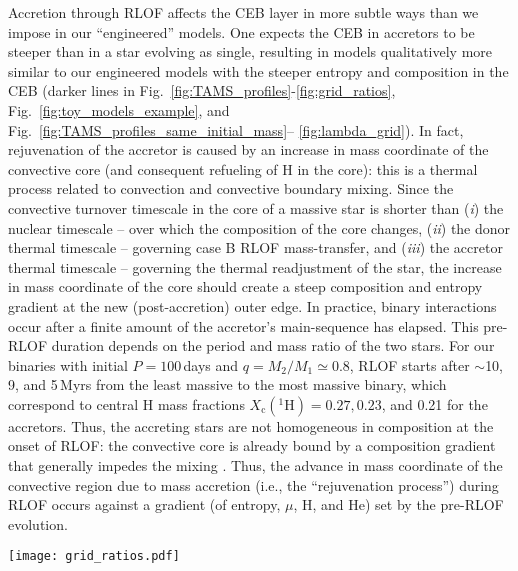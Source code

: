 \documentclass[twocolumn,twocolappendix,trackchanges]{aastex63}
\DeclareRobustCommand{\Figref}[1]{Fig.~\ref{#1}}
\begin{document}
Accretion through RLOF affects the CEB layer in more subtle ways than
we impose in our ``engineered'' models. One expects the CEB in
accretors to be steeper than in a star evolving as single, resulting
in models qualitatively more similar to our engineered models with the
steeper entropy and composition in the CEB (darker lines in
\Figref{fig:TAMS_profiles}-\ref{fig:grid_ratios},
\Figref{fig:toy_models_example}, and \Figref{fig:TAMS_profiles_same_initial_mass}--%
\ref{fig:lambda_grid}).
In fact, rejuvenation of the accretor is caused by an increase in mass
coordinate of the convective core (and consequent refueling of H in
the core): this is a thermal process related to convection and
convective boundary mixing. Since the convective turnover timescale in
the core of a massive star is shorter than (\emph{i}) the nuclear
timescale -- over which the composition of the core changes,
(\emph{ii}) the donor thermal timescale -- governing case B RLOF
mass-transfer, and (\emph{iii}) the accretor thermal timescale --
governing the thermal readjustment of the star, the increase in mass
coordinate of the core should create a steep composition and entropy
gradient at the new (post-accretion) outer edge. In practice, binary
interactions occur after a finite amount of the accretor's
main-sequence has elapsed. This pre-RLOF duration depends on the
period and mass ratio of the two stars. For our binaries with initial
$P=100$\,days and $q=M_2/M_1\simeq 0.8$, RLOF starts after $\sim{}$10,
9, and 5\,Myrs from the least massive to the most massive binary,
which correspond to central H mass fractions
$X_\mathrm{c}(^1\mathrm{H}) = 0.27, 0.23$, and 0.21 for the accretors.
Thus, the accreting stars are not homogeneous in composition at the
onset of RLOF: the convective core is already bound by a composition
gradient that generally impedes the mixing \citep[e.g.,][]{yoon:2005}.
Thus, the advance in mass coordinate of the convective region due to
mass accretion (i.e., the ``rejuvenation process'') during RLOF occurs
against a gradient (of entropy, $\mu$, H, and He) set by the pre-RLOF
evolution.

\begin{figure*}[htbp]
  \texttt{[image: grid\_ratios.pdf]}
  \caption{Ratios of the binding energy profiles (including internal
    energy) of the accretor stars divided stars of the same total mass
    post-RLOF. The orange solid line at 1 shows the ratio of the
    accretor to itself as a sanity check, red solid lines show the
    ratio of the accretor to a non-rotating single star, while the
    other colors show the ratio to ``engineered'' star. Each panel
    shows the ratios at the first time the models reach the radius
    indicated on the right and by the vertical dashed gray line. For
    the binding energy profiles in the numerator and denominator see
    \Figref{fig:BE_profiles}.}
  \label{fig:grid_ratios}
\end{figure*}
\end{document}

